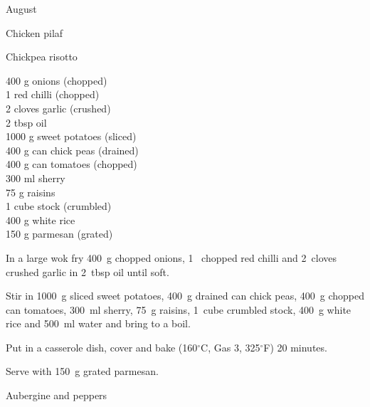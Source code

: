 \begin{menu}{August}
\begin{recipe}{2}{Chicken pilaf}
\begin{instructions}
    \end{instructions}
    \end{recipe}%
  
    \begin{recipe}{2}{Chickpea risotto}%
    
		\begin{ingredients}
		400 g onions (chopped) \\
	1  red chilli (chopped) \\
	2 cloves garlic (crushed) \\
	2 tbsp oil  \\
	1000 g sweet potatoes (sliced) \\
	400 g can chick peas (drained) \\
	400 g can tomatoes (chopped) \\
	300 ml sherry  \\
	75 g raisins  \\
	1 cube stock (crumbled) \\
	400 g white rice  \\
	150 g parmesan (grated) \\
	
		\end{ingredients}
	
    \begin{instructions}
    \item 
        In a large wok fry
        400~g chopped onions,
        1~ chopped red chilli
        and
        2~cloves crushed garlic
        in
        2~tbsp  oil
        until soft.
      \item 
        Stir in
        1000~g sliced sweet potatoes,
        400~g drained can chick peas,
        400~g chopped can tomatoes,
        300~ml  sherry,
        75~g  raisins,
        1~cube crumbled stock,
        400~g  white rice
        and
        500~ml  water
        and bring to a boil.
      \item 
        Put in a
        casserole dish,
        cover and bake 
      (160$^{\circ}$C, Gas 3, 325$^{\circ}$F)
     20 minutes.
      \item 
        Serve with
        150~g grated parmesan.
      
    \end{instructions}
    \end{recipe}%
  
    \begin{recipe}{2}{Aubergine and peppers}%
    

\end{recipe}
\end{menu}
